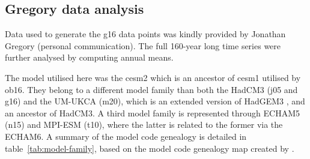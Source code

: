 \documentclass{ametsocV6.1}
\begin{document}
\subsection{Gregory data analysis}\label{ap:g16}

Data used to generate the \gls{g16} data points was kindly provided by Jonathan Gregory
(personal communication). The full 160-year long time series were further analysed by
computing annual means.

\appendix[C]


The model utilised here was the \gls{cesm2} which is an ancestor of \gls{cesm1} utilised
by \gls{ob16}. They belong to a different model family than both the HadCM3 (\gls{j05}
and \gls{g16}) and the UM-UKCA (\gls{m20}), which is an extended version of HadGEM3
\citep{dhomse2014}, and an ancestor of HadCM3. A third model family is represented
through ECHAM5 (\gls{n15}) and MPI-ESM (\gls{t10}), where the latter is related to the
former via the ECHAM6. A summary of the model code genealogy is detailed in
table~\ref{tab:model-family}, based on the model code genealogy map created by
\citet{kuma2023}.
\end{document}
